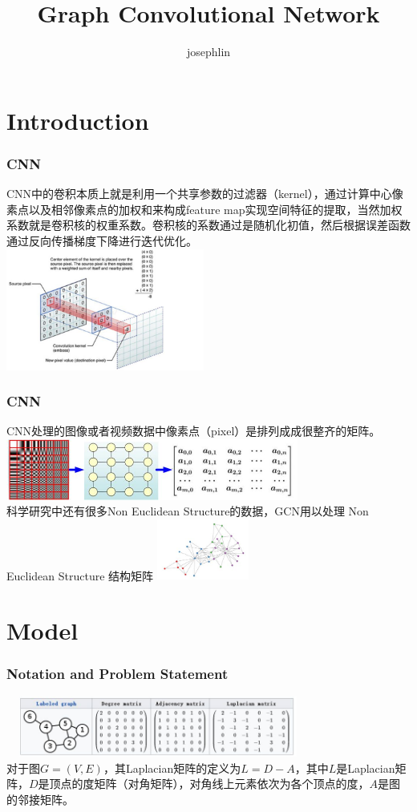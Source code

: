 \documentclass{beamer}
\title{Graph Convolutional Network}
\author{josephlin}
\begin{document}

\section{Introduction}
\begin{frame}
    \frametitle{CNN}
    CNN中的卷积本质上就是利用一个共享参数的过滤器（kernel），通过计算中心像素点以及相邻像素点的加权和来构成feature map实现空间特征的提取，当然加权系数就是卷积核的权重系数。卷积核的系数通过是随机化初值，然后根据误差函数通过反向传播梯度下降进行迭代优化。\\
    \includegraphics[height=4cm]{images/feature_map.jpg}
\end{frame}

\begin{frame}
    \frametitle{CNN}
    CNN处理的图像或者视频数据中像素点（pixel）是排列成成很整齐的矩阵。\\
    \includegraphics[height=2cm]{images/Euclidean_Structure.jpg}\\
    科学研究中还有很多Non Euclidean Structure的数据，GCN用以处理 Non Euclidean Structure 结构矩阵
    \includegraphics[height=2cm]{images/Non_Eclidean_Structure.jpg}
\end{frame}

\section{Model}
\begin{frame}
    \frametitle{Notation and Problem Statement}
    \includegraphics[height=2cm, width=10cm]{images/laplacian.jpg}\\
    对于图$G=(V, E)$，其Laplacian矩阵的定义为$L=D-A$，其中$L$是Laplacian矩阵，$D$是顶点的度矩阵（对角矩阵），对角线上元素依次为各个顶点的度，$A$是图的邻接矩阵。

\end{frame}
\end{document}
